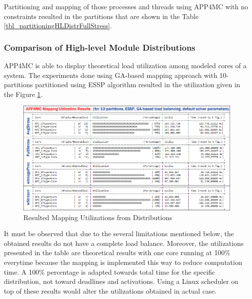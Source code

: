 Partitioning and mapping of those processes and threads using APP4MC with no constraints resulted in the partitions that are shown in the Table \ref{tbl_partitioningHLDistrFullStress}.

\partitioningHLDistrFullStress


\subsubsection{Comparison of High-level Module Distributions}
APP4MC is able to display theoretical load utilization among modeled cores of a system. The experiments done using GA-based mapping approach with 10-partitions partitioned using ESSP algorithm resulted in the utilization given in the Figure \ref{fig:mappingutil}. 

\begin{figure}[!ht]
	\centering
	\captionsetup{justification=centering}
	\includegraphics[width=\textwidth]{content/images/mappingutil.png}
	\caption{Resulted Mapping Utilizations from Distributions}
	\label{fig:mappingutil}
\end{figure}

It must be observed that due to the several limitations mentioned below, the obtained results do not have a complete load balance. Moreover, the utilizations presented in the table are theoretical results with one core running at 100\% everytime because the mapping is implemented this way to reduce computation time. A 100\% percentage is adapted towards total time for the specific distribution, not toward deadlines and activations. Using a Linux scheduler on top of these results would alter the utilizations obtained in actual case.

